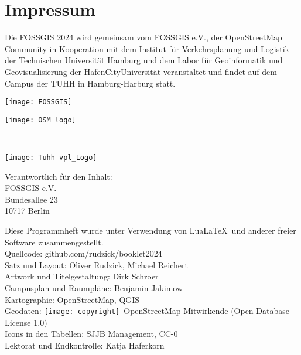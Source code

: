 \newpage
\vspace*{-4.5em}

\section*{Impressum}
\label{impressum}
\pagestyle{cropmarksstyle}

\RaggedRight
{\small
Die FOSSGIS 2024 wird gemeinsam vom FOSSGIS e.V.,  der OpenStreetMap Community
in Kooperation mit dem Institut für Verkehrsplanung und Logistik der Technischen Universität Hamburg
und dem Labor für Geoinformatik und Geovisualisierung der HafenCityUniversität veranstaltet und
findet auf dem Campus der TUHH in Hamburg-Harburg statt.

\vspace{0.5em}
\newlength\logoHeight
\setlength{\logoHeight}{4.0\baselineskip}
\begin{minipage}[c]{0.5\textwidth}
  \texttt{[image: FOSSGIS]}
\end{minipage}
\begin{minipage}[c]{0.45\textwidth}
  \texttt{[image: OSM\_logo]}
\end{minipage}\\
\begin{minipage}[l]{0.45\textwidth}
  \texttt{[image: Tuhh-vpl\_Logo]}
\end{minipage}
\begin{minipage}[r]{0.45\textwidth}
  
\end{minipage}

\vspace{0.5em}
\noindent Verantwortlich für den Inhalt:\\
FOSSGIS e.V.\\
Bundesallee 23\\
10717 Berlin

\vspace{0.5em}
\noindent Diese Programmheft wurde unter Verwendung von Lua\LaTeX\ und 
anderer freier Software zusammengestellt.\\
Quellcode: github.com/rudzick/booklet2024\\
\noindent Satz und Layout: Oliver Rudzick, Michael Reichert\\
Artwork und Titelgestaltung: Dirk Schroer\\
Campusplan und Raumpläne: Benjamin Jakimow\\
Kartographie: OpenStreetMap, QGIS\\
Geodaten: \texttt{[image: copyright]}~Open\-Street\-Map-Mitwirkende (Open Database License 1.0)\\
Icons in den Tabellen: SJJB Management, CC-0\\
Lektorat und Endkontrolle: Katja Haferkorn

}
